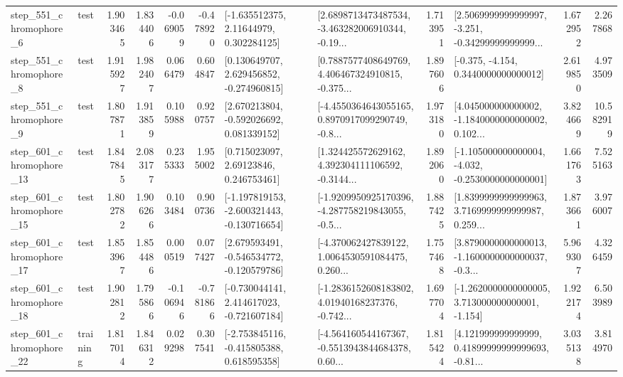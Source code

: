 \begin{tabular}{llrrrrllrlrr}
   step\_551\_chromophore\_6 &      test &      1.903465 &    1.834406 &     -0.069059 & -0.478920 &     [-1.635512375, 2.11644979, 0.302284125] &  [2.6898713473487534, -3.463282006910344, -0.19... &       1.713951 &  [2.5069999999999997, -3.251, -0.34299999999999... &            1.672952 &          2.267868 \\
   step\_551\_chromophore\_8 &      test &      1.915927 &    1.982407 &      0.066479 &  0.604847 &    [0.130649707, 2.629456852, -0.274960815] &  [0.7887577408649769, 4.406467324910815, -0.375... &       1.897606 &               [-0.375, -4.154, 0.3440000000000012] &            2.619850 &          4.973509 \\
   step\_551\_chromophore\_9 &      test &      1.807871 &    1.913859 &      0.105988 &  0.920757 &    [2.670213804, -0.592026692, 0.081339152] &  [-4.4550364643055165, 0.8970917099290749, -0.8... &       1.973180 &  [4.045000000000002, -1.1840000000000002, 0.102... &            3.824669 &         10.582919 \\
  step\_601\_chromophore\_13 &      test &      1.847845 &    2.083177 &      0.235333 &  1.955002 &      [0.715023097, 2.69123846, 0.246753461] &  [1.324425572629162, 4.392304111106592, -0.3144... &       1.892060 &  [-1.105000000000004, -4.032, -0.2530000000000001] &            1.661763 &          7.525163 \\
  step\_601\_chromophore\_15 &      test &      1.802782 &    1.906266 &      0.103484 &  0.900736 &  [-1.197819153, -2.600321443, -0.130716654] &  [-1.9209950925170396, -4.287758219843055, -0.5... &       1.887425 &  [1.8399999999999963, 3.7169999999999987, 0.259... &            1.873661 &          3.976007 \\
  step\_601\_chromophore\_17 &      test &      1.853967 &    1.854486 &      0.000519 &  0.077427 &   [2.679593491, -0.546534772, -0.120579786] &  [-4.370062427839122, 1.0064530591084475, 0.260... &       1.757468 &  [3.8790000000000013, -1.1600000000000037, -0.3... &            5.969307 &          4.326459 \\
  step\_601\_chromophore\_18 &      test &      1.902812 &    1.795866 &     -0.106946 & -0.781866 &   [-0.730044141, 2.414617023, -0.721607184] &  [-1.2836152608183802, 4.01940168237376, -0.742... &       1.697704 &   [-1.2620000000000005, 3.713000000000001, -1.154] &            1.922174 &          6.503989 \\
  step\_601\_chromophore\_22 &  training &      1.817014 &    1.846312 &      0.029298 &  0.307541 &   [-2.753845116, -0.415805388, 0.618595358] &  [-4.564160544167367, -0.5513943844684378, 0.60... &       1.815424 &  [4.121999999999999, 0.41899999999999693, -0.81... &            3.035138 &          3.814970 \\

\end{tabular}
